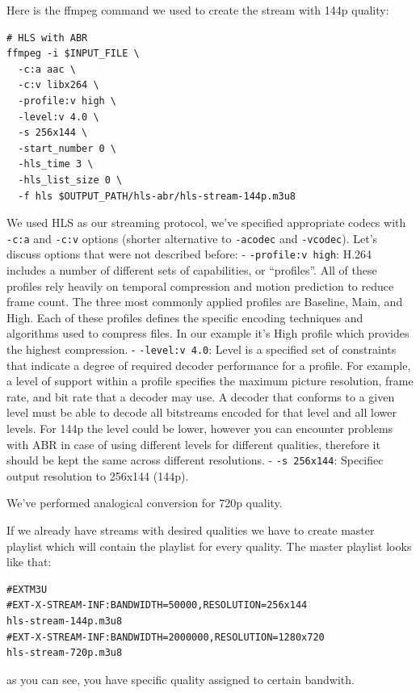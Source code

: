 \documentclass{article}
\begin{document}
Here is the ffmpeg command we used to create the stream with 144p
quality:

\begin{verbatim}
# HLS with ABR
ffmpeg -i $INPUT_FILE \
  -c:a aac \
  -c:v libx264 \
  -profile:v high \
  -level:v 4.0 \
  -s 256x144 \
  -start_number 0 \
  -hls_time 3 \
  -hls_list_size 0 \
  -f hls $OUTPUT_PATH/hls-abr/hls-stream-144p.m3u8
\end{verbatim}

We used HLS as our streaming protocol, we've specified appropriate
codecs with \texttt{-c:a} and \texttt{-c:v} options (shorter alternative
to \texttt{-acodec} and \texttt{-vcodec}). Let's discuss options that
were not described before: - \texttt{-profile:v\ high}: H.264 includes a
number of different sets of capabilities, or ``profiles''. All of these
profiles rely heavily on temporal compression and motion prediction to
reduce frame count. The three most commonly applied profiles are
Baseline, Main, and High. Each of these profiles defines the specific
encoding techniques and algorithms used to compress files. In our
example it's High profile which provides the highest compression. -
\texttt{-level:v\ 4.0}: Level is a specified set of constraints that
indicate a degree of required decoder performance for a profile. For
example, a level of support within a profile specifies the maximum
picture resolution, frame rate, and bit rate that a decoder may use. A
decoder that conforms to a given level must be able to decode all
bitstreams encoded for that level and all lower levels. For 144p the
level could be lower, however you can encounter problems with ABR in
case of using different levels for different qualities, therefore it
should be kept the same across different resolutions. -
\texttt{-s\ 256x144}: Specifiec output resolution to 256x144 (144p).

We've performed analogical conversion for 720p quality.

If we already have streams with desired qualities we have to create
master playlist which will contain the playlist for every quality. The
master playlist looks like that:

\begin{verbatim}
#EXTM3U
#EXT-X-STREAM-INF:BANDWIDTH=50000,RESOLUTION=256x144
hls-stream-144p.m3u8
#EXT-X-STREAM-INF:BANDWIDTH=2000000,RESOLUTION=1280x720
hls-stream-720p.m3u8
\end{verbatim}

as you can see, you have specific quality assigned to certain bandwith.
\end{document}
